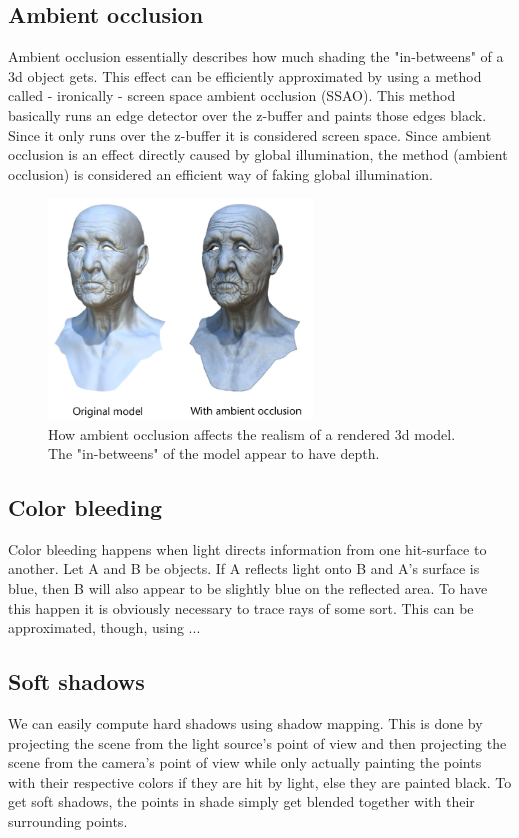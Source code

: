 \documentclass{ACGSeminar}
\begin{document}
	\subsection{Ambient occlusion}
		Ambient occlusion essentially describes how much shading the "in-betweens" of a 3d object gets. This effect can be efficiently approximated by using a method called - ironically - screen space ambient occlusion (SSAO). This method basically runs an edge detector over the z-buffer and paints those edges black. Since it only runs over the z-buffer it is considered screen space. Since ambient occlusion is an effect directly caused by global illumination, the method (ambient occlusion) is considered an efficient way of faking global illumination.
		\begin{figure}[htb!]%
			\begin{center}%
				\includegraphics[width=7cm]{img/ambient_occlusion.png}
			\end{center}%
			\caption{How ambient occlusion affects the realism of a rendered 3d model. The "in-betweens" of the model appear to have depth.}%
			\label{fig:normal_buffer}%
		\end{figure}%
	\subsection{Color bleeding}
		Color bleeding happens when light directs information from one hit-surface to another. Let A and B be objects. If A reflects light onto B and A's surface is blue, then B will also appear
		to be slightly blue on the reflected area. To have this happen it is obviously necessary to trace rays of some sort. This can be approximated, though, using ... %

	\subsection{Soft shadows}
		We can easily compute hard shadows using shadow mapping. This is done by projecting the scene from the light source's point of view and then projecting the scene from the camera's point of view while only actually painting the points with their respective colors if they are hit by light, else they are painted black. To get soft shadows, the points in shade simply get blended together with their surrounding points.
\end{document}
